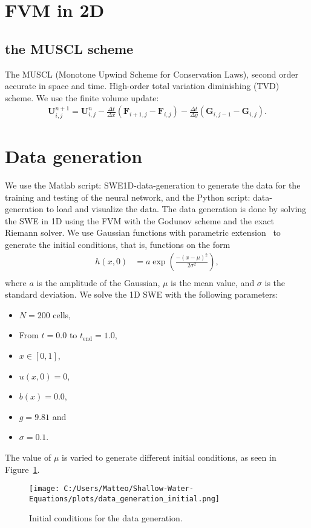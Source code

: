 \section{FVM in 2D}

\subsection{the MUSCL scheme}
The MUSCL (Monotone Upwind Scheme for Conservation Laws), second order accurate in space and time.
High-order total variation diminishing (TVD) scheme.
We use the finite volume update:
\begin{align}
    \mathbf{U}_{i,j}^{n+1} = \mathbf{U}_{i,j}^n - \frac{\Delta t}{\Delta x}(\mathbf{F}_{i+1,j} - \mathbf{F}_{i,j}) - \frac{\Delta t}{\Delta y}(\mathbf{G}_{i,j-1} - \mathbf{G}_{i,j}).
\end{align}






\section{Data generation}
We use the Matlab script: SWE1D-data-generation to generate the data for the training and testing of the neural network, and the Python script: data-generation to load and visualize the data.
The data generation is done by solving the SWE in 1D using the FVM with the Godunov scheme and the exact Riemann solver.
We use Gaussian functions with parametric extension~\cite{Gaussian} to generate the initial conditions, that is, functions on the form
\begin{align*}
    h(x,0) &= a \exp{\left(\frac{-{(x-\mu)}^2}{2\sigma^2}\right)}, \\
\end{align*}
where $a$ is the amplitude of the Gaussian, $\mu$ is the mean value, and $\sigma$ is the standard deviation.
We solve the 1D SWE with the following parameters:
\begin{itemize}
    \item $N = 200$ cells,
    \item From $t = 0.0$ to $t_{\text{end}} = 1.0$,
    \item $x \in [0, 1]$,
    \item $u(x,0) = 0$,
    \item $b(x) = 0.0$,
    \item $g = 9.81$ and
    \item $\sigma = 0.1$.
\end{itemize}
The value of $\mu$ is varied to generate different initial conditions, as seen in Figure~\ref{fig:data_generation_initial}.
\begin{figure}[H]
    \centering
    \texttt{[image: C:/Users/Matteo/Shallow-Water-Equations/plots/data\_generation\_initial.png]}
    \caption{Initial conditions for the data generation.}\label{fig:data_generation_initial}
\end{figure}


